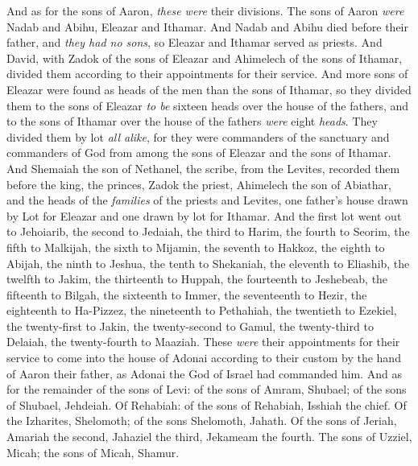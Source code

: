 \begin{biblechapter} %
 And as for the sons of Aaron, \textit{these were} their divisions. The sons of Aaron \textit{were} Nadab and Abihu, Eleazar and Ithamar.
\verse And Nadab and Abihu died before their father, and \textit{they had no sons}, so Eleazar and Ithamar served as priests.
\verse And David, with Zadok of the sons of Eleazar and Ahimelech of the sons of Ithamar, divided them according to their appointments for their service.
\verse And more sons of Eleazar were found as heads of the men than the sons of Ithamar, so they divided them to the sons of Eleazar \textit{to be} sixteen heads over the house of the fathers, and to the sons of Ithamar over the house of the fathers \textit{were} eight \textit{heads}.
\verse They divided them by lot \textit{all alike}, for they were commanders of the sanctuary and commanders of God from among the sons of Eleazar and the sons of Ithamar.
\verse And Shemaiah the son of Nethanel, the scribe, from the Levites, recorded them before the king, the princes, Zadok the priest, Ahimelech the son of Abiathar, and the heads of the \textit{families} of the priests and Levites, one father’s house drawn by Lot for Eleazar and one drawn by lot for Ithamar.
\verse And the first lot went out to Jehoiarib, the second to Jedaiah,
\verse the third to Harim, the fourth to Seorim,
\verse the fifth to Malkijah, the sixth to Mijamin,
\verse the seventh to Hakkoz, the eighth to Abijah,
\verse the ninth to Jeshua, the tenth to Shekaniah,
\verse the eleventh to Eliashib, the twelfth to Jakim,
\verse the thirteenth to Huppah, the fourteenth to Jeshebeab,
\verse the fifteenth to Bilgah, the sixteenth to Immer,
\verse the seventeenth to Hezir, the eighteenth to Ha-Pizzez,
\verse the nineteenth to Pethahiah, the twentieth to Ezekiel,
\verse the twenty-first to Jakin, the twenty-second to Gamul,
\verse the twenty-third to Delaiah, the twenty-fourth to Maaziah.
\verse These \textit{were} their appointments for their service to come into the house of Adonai according to their custom by the hand of Aaron their father, as Adonai the God of Israel had commanded him.
\verse And as for the remainder of the sons of Levi: of the sons of Amram, Shubael; of the sons of Shubael, Jehdeiah.
\verse Of Rehabiah: of the sons of Rehabiah, Isshiah the chief.
\verse Of the Izharites, Shelomoth; of the sons Shelomoth, Jahath.
\verse Of the sons of Jeriah, Amariah the second, Jahaziel the third, Jekameam the fourth.
\verse The sons of Uzziel, Micah; the sons of Micah, Shamur.

\end{biblechapter}
